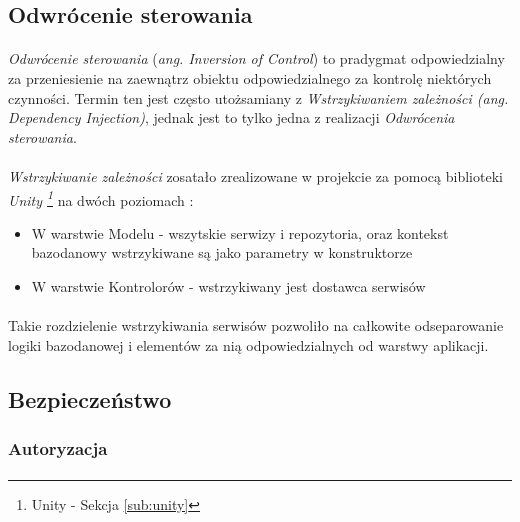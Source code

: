 \subsection{Odwrócenie sterowania} %
\label{sub:odwr_cenie_sterowania}
\paragraph{} 
\textit{Odwrócenie sterowania} (\textit{ang. Inversion of Control}) to pradygmat odpowiedzialny za przeniesienie na zaewnątrz obiektu odpowiedzialnego za kontrolę niektórych czynności. Termin ten jest często utożsamiany z \textit{Wstrzykiwaniem zależności (ang. Dependency Injection)}, jednak jest to tylko jedna z realizacji \textit{Odwrócenia sterowania}. 

\paragraph{} %
\label{par:}
\textit{Wstrzykiwanie zależności} zosatało zrealizowane w projekcie za pomocą biblioteki \textit{Unity \footnote{Unity - Sekcja \ref{sub:unity}}} na dwóch poziomach :
\begin{itemize}
	\item W warstwie Modelu - wszytskie serwizy i repozytoria, oraz kontekst bazodanowy wstrzykiwane są jako parametry w konstruktorze
	\item W warstwie Kontrolorów - wstrzykiwany jest dostawca serwisów
\end{itemize} 

\paragraph{} %
\label{par:}
Takie rozdzielenie wstrzykiwania serwisów pozwoliło na całkowite odseparowanie logiki bazodanowej i elementów za nią odpowiedzialnych od warstwy aplikacji.

\subsection{Bezpieczeństwo} %
\subsubsection{Autoryzacja}
\paragraph{} %
\label{par:paragraph_name}

